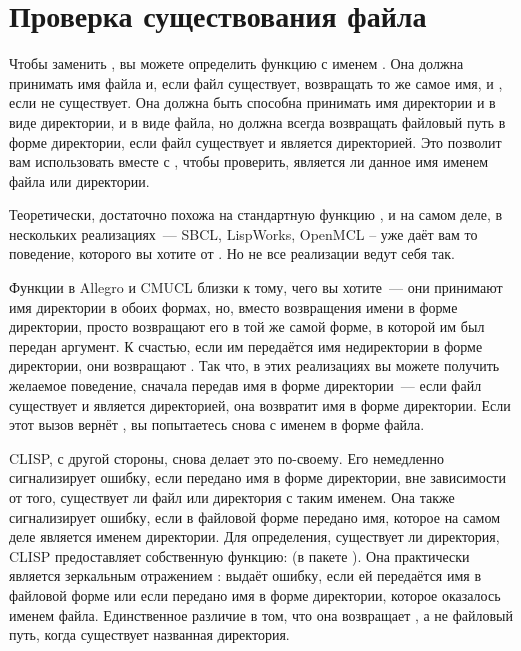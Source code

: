 \section{Проверка существования файла}

Чтобы заменить , вы можете определить функцию с именем
. Она должна принимать имя файла и, если файл существует, возвращать
то же самое имя, и , если не существует. Она должна быть способна принимать имя
директории и в виде директории, и в виде файла, но должна всегда возвращать файловый путь
в форме директории, если файл существует и является директорией. Это позволит вам
использовать  вместе с , чтобы проверить,
является ли данное имя именем файла или директории.

Теоретически,  достаточно похожа на стандартную функцию
, и на самом деле, в нескольких реализациях~--- SBCL, LispWorks, OpenMCL
–  уже даёт вам то поведение, которого вы хотите от
. Но не все реализации  ведут себя так.

Функции  в Allegro и CMUCL близки к тому, чего вы хотите~--- они
принимают имя директории в обоих формах, но, вместо возвращения имени в форме директории,
просто возвращают его в той же самой форме, в которой им был передан аргумент. К счастью,
если им передаётся имя недиректории в форме директории, они возвращают . Так
что, в этих реализациях вы можете получить желаемое поведение, сначала передав
 имя в форме директории~--- если файл существует и является директорией,
она возвратит имя в форме директории. Если этот вызов вернёт , вы попытаетесь
снова с именем в форме файла.

CLISP, с другой стороны, снова делает это по-своему. Его  немедленно
сигнализирует ошибку, если передано имя в форме директории, вне зависимости от того,
существует ли файл или директория с таким именем. Она также сигнализирует ошибку, если в
файловой форме передано имя, которое на самом деле является именем директории. Для
определения, существует ли директория, CLISP предоставляет собственную функцию:
 (в пакете ). Она практически является зеркальным
отражением : выдаёт ошибку, если ей передаётся имя в файловой форме или
если передано имя в форме директории, которое оказалось именем файла. Единственное
различие в том, что она возвращает , а не файловый путь, когда существует
названная директория.

